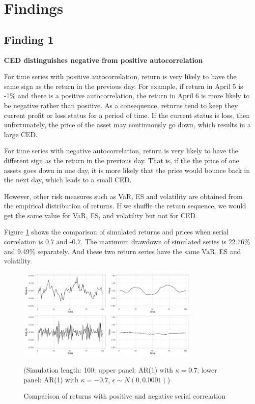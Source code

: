 \documentclass[11pt]{article}
\begin{document}
\section{Findings}  %

\subsection{Finding 1}

\textbf{CED distinguishes negative from positive autocorrelation}

For time series with positive autocorrelation, return is very likely to have the same sign as the return in the previous day. For example, if return in April 5 is -1\% and there is a positive autocorrelation, the return in April 6 is more likely to be negative rather than positive. As a consequence, returns tend to keep they current profit or loss status for a period of time. If the current status is loss, then unfortunately, the price of the asset may continuously go down, which results in a large CED.

For time series with negative autocorrelation, return is very likely to have the different sign as the return in the previous day. That is, if the the price of one assets goes down in one day, it is more likely that the price would bounce back in the next day, which leads to a small CED. 

However, other risk measures such as VaR, ES and volatility are obtained from the empirical distribution of returns. If we shuffle the return sequence, we would get the same value for VaR, ES, and volatility but not for CED.

Figure \ref{fig:Comparison_pos_neg_autocorrelation} shows the comparison of simulated returns and prices when serial correlation is 0.7 and -0.7. The maximum drawdown of simulated series is 22.76\% and 9.49\% separately. And these two return series have the same VaR, ES and volatility.

\begin{figure}[H]
\centering
\includegraphics[width = 0.8\textwidth]{../figures/simulation/Comparison_pos_neg_autocorrelation}
\caption{Comparison of returns with positive and negative serial correlation}
(Simulation length: 100; upper panel: AR(1) with $\kappa=0.7$; lower panel: AR(1) with $\kappa=-0.7$, $\epsilon\sim N(0, 0.0001)$)
\label{fig:Comparison_pos_neg_autocorrelation}
\end{figure}
\end{document}
